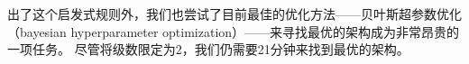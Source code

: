 
出了这个启发式规则外，我们也尝试了目前最佳的优化方法{------}贝叶斯超参数优化（bayesian hyperparameter optimization）{------}来寻找最优的{\li}架构成为非常昂贵的一项任务。
尽管将级数限定为2，我们仍需要21分钟来找到最优的架构。

